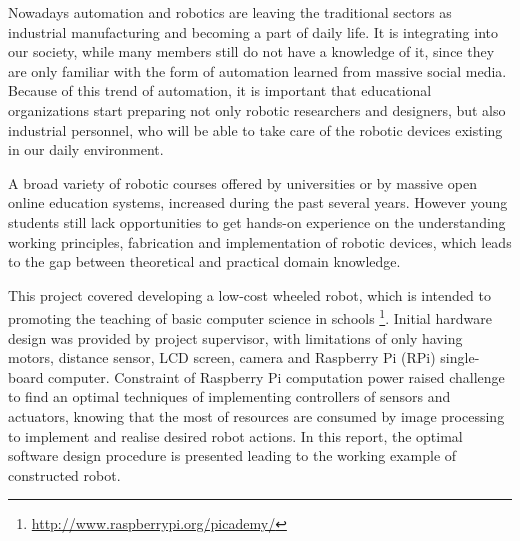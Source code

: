 Nowadays automation and robotics are leaving the traditional sectors as industrial manufacturing and becoming a part of daily life. It is integrating into our society, while many members still do not have a knowledge of it, since they are only familiar with the form of automation learned from massive social media.
Because of this trend of automation, it is important that educational organizations start preparing not only robotic researchers and designers, but also industrial personnel, who will be able
to take care of the robotic devices existing in our daily environment. 

A broad variety of robotic courses offered by universities or by massive open online education systems, increased during the past several years. However young students still lack opportunities to get hands-on experience on the understanding working principles, fabrication and implementation of robotic devices, which leads to the gap between theoretical and practical domain knowledge.

This project covered developing a low-cost wheeled robot, which is intended to promoting the teaching of basic computer science in schools \footnote{\url{http://www.raspberrypi.org/picademy/}}. Initial hardware design was provided by project supervisor, with limitations of only having motors, distance sensor, LCD screen, camera and Raspberry Pi (RPi) single-board computer.
Constraint of  Raspberry Pi computation power raised challenge to find an  optimal techniques of implementing controllers of sensors and actuators, knowing that the most of resources are consumed by image processing to implement and realise desired robot actions. In this report, the optimal software design procedure is presented leading to the working example of constructed robot.
